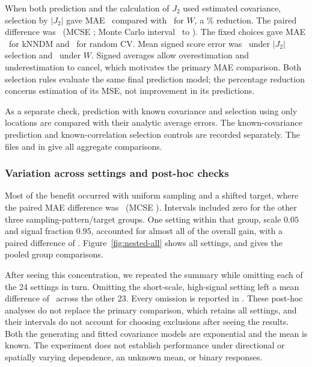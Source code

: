 \documentclass[11pt,a4paper]{article}
\begin{document}
When both prediction and the calculation of $J_2$ used estimated covariance, selection by $|J_2|$ gave MAE \NestedMAEJTwo\ compared with \NestedMAEW\ for $W$, a \NestedReduction\% reduction. The paired difference was \NestedDelta\ (MCSE \NestedSE; Monte Carlo interval \NestedLower\ to \NestedUpper). The fixed choices gave MAE \NestedMAEKnn\ for kNNDM and \NestedMAERandom\ for random CV. Mean signed score error was \NestedBiasJTwo\ under $|J_2|$ selection and \NestedBiasW\ under $W$. Signed averages allow overestimation and underestimation to cancel, which motivates the primary MAE comparison. Both selection rules evaluate the same final prediction model; the percentage reduction concerns estimation of its MSE, not improvement in its predictions.

As a separate check, prediction with known covariance and selection using only locations are compared with their analytic average errors. The known-covariance prediction and known-correlation selection controls are recorded separately. The files  and  in  give all aggregate comparisons.

\subsubsection{Variation across settings and post-hoc checks}
\label{sec:refitting-variation}
Most of the benefit occurred with uniform sampling and a shifted target, where the paired MAE difference was \NestedShiftDelta\ (MCSE \NestedShiftSE). Intervals included zero for the other three sampling-pattern/target groups. One setting within that group, scale $0.05$ and signal fraction $0.95$, accounted for almost all of the overall gain, with a paired difference of \NestedStrongCellDelta. Figure~\ref{fig:nested-all} shows all settings, and  gives the pooled group comparisons.

After seeing this concentration, we repeated the summary while omitting each of the 24 settings in turn. Omitting the short-scale, high-signal setting left a mean difference of \NestedOtherCellsDelta\ across the other 23. Every omission is reported in . These post-hoc analyses do not replace the primary comparison, which retains all settings, and their intervals do not account for choosing exclusions after seeing the results. Both the generating and fitted covariance models are exponential and the mean is known. The experiment does not establish performance under directional or spatially varying dependence, an unknown mean, or binary responses.
\end{document}
